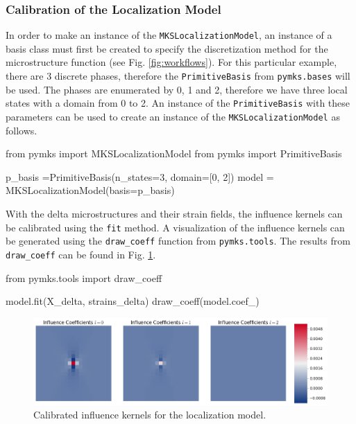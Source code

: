 \documentclass{bmcart}
\newcommand{\fimage}
{\fcolorbox{outcolor}{white}}
{}
\begin{document}
    
    \subsubsection{Calibration of the Localization
Model}\label{calibration-of-the-localization-model}

    In order to make an instance of the \texttt{MKSLocalizationModel},
an instance of a basis class must first be created to specify the
discretization method for the microstructure function (see Fig.
\ref{fig:workflows}). For this particular example, there are 3 discrete
phases, therefore the \texttt{PrimitiveBasis} from \texttt{pymks.bases}
will be used. The phases are enumerated by 0, 1 and 2, therefore
we have three local states with a domain from 0 to 2. An instance of the
\texttt{PrimitiveBasis} with these parameters can be used to create an
instance of the \texttt{MKSLocalizationModel} as follows.

\begin{_input}
from pymks import MKSLocalizationModel
from pymks import PrimitiveBasis

p_basis =PrimitiveBasis(n_states=3, domain=[0, 2])
model = MKSLocalizationModel(basis=p_basis)
\end{_input}

    With the delta microstructures and their strain fields, the influence
kernels can be calibrated using the \texttt{fit} method.
A visualization of the influence kernels can be generated using the
\texttt{draw\_coeff} function from \texttt{pymks.tools}. The results
from \texttt{draw\_coeff} can be found in Fig. \ref{fig:drawCoeff}.

\begin{_input}
from pymks.tools import draw_coeff

model.fit(X_delta, strains_delta)
draw_coeff(model.coef_)
\end{_input}



\begin{figure}
    \centering
    \includegraphics[scale=.37]{pymks_paper_localization_files/pymks_paper_localization_10_0.png}
    \caption{Calibrated influence kernels for the localization model.}
    \label{fig:drawCoeff}
\end{figure}
\end{document}
